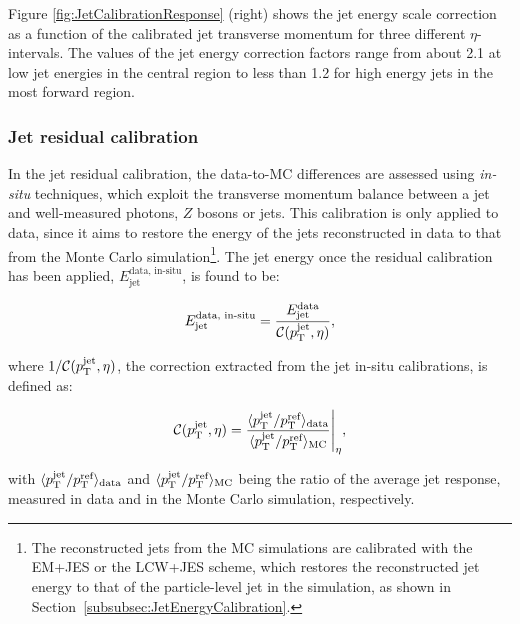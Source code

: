 Figure \ref{fig:JetCalibrationResponse} (right) shows the jet energy scale correction as a function of the calibrated jet transverse momentum for three different $\eta$-intervals.
The values of the jet energy correction factors range from about 2.1 at low jet energies in the central region to less than 1.2 for high energy jets in the most forward region.


\subsubsection{Jet residual calibration}
    \label{subsubsec:JetResidualCalibration}

In the jet residual calibration, the data-to-MC differences are assessed using \emph{in-situ} techniques, which exploit the transverse momentum balance between a jet and well-measured photons, $Z$ bosons or jets.
This calibration is only applied to data, since it aims to restore the energy of the jets reconstructed in data to that from the Monte Carlo simulation\footnote{The reconstructed jets from the MC simulations are calibrated with the EM+JES or the LCW+JES scheme, which restores the reconstructed jet energy to that of the particle-level jet in the simulation, as shown in Section~\ref{subsubsec:JetEnergyCalibration}.}.
The jet energy once the residual calibration has been applied, $E_{\text{jet}}^{\text{data, in-situ}}$, is found to be:

\begin{equation}
E_{\text{jet}}^{\text{data, in-situ}} = \frac{E_{\text{jet}}^{\text{data}}}{\mathcal{C}(\pt^{\text{jet}}, \eta)},
\label{eq:JetInSituCorrection}
\end{equation}

\noindent where  $1 / \mathcal{C}(\pt^{\text{jet}}, \eta)$, the correction extracted from the jet in-situ calibrations, is defined as:

\begin{equation}
\mathcal{C}(\pt^{\text{jet}}, \eta) = \frac{\langle \pt^{\text{jet}} / \pt^{\text{ref}} \rangle_{\text{data}}}{\langle \pt^{\text{jet}} / \pt^{\text{ref}} \rangle_{\text{MC}}}\Bigg|_{\eta},
\label{eq:JetInSituCorrectionFactor}
\end{equation}

\noindent with $\langle p_{\mathrm{T}}^{\text{jet}} / p_{\mathrm{T}}^{\text{ref}} \rangle_{\text{data}}$ and $\langle p_{\mathrm{T}}^{\text{jet}} / p_{\mathrm{T}}^{\text{ref}} \rangle_{\text{MC}}$ being the ratio of the average jet response, measured in data and in the Monte Carlo simulation, respectively.

